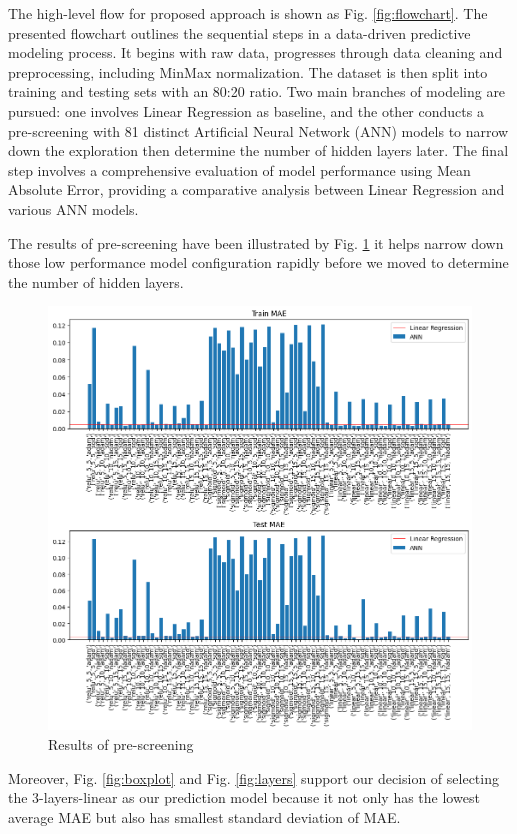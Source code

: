 \documentclass[sigplan,screen]{acmart}
\begin{document}
The high-level flow for proposed approach is shown as Fig. \ref{fig:flowchart}. The presented flowchart outlines the sequential steps in a data-driven predictive modeling process. It begins with raw data, progresses through data cleaning and preprocessing, including MinMax normalization. The dataset is then split into training and testing sets with an 80:20 ratio. Two main branches of modeling are pursued: one involves Linear Regression as baseline, and the other conducts a pre-screening with 81 distinct Artificial Neural Network (ANN) models to narrow down the exploration then determine the number of hidden layers later. The final step involves a comprehensive evaluation of model performance using Mean Absolute Error, providing a comparative analysis between Linear Regression and various ANN models.

The results of pre-screening have been illustrated by Fig. \ref{fig:prescreen_output} it helps narrow down those low performance model configuration rapidly before we moved to determine the number of hidden layers.

\begin{figure}
  \centering
  \includegraphics[width=0.8\linewidth]{prescreening_output.png}
  \caption{Results of pre-screening}
  \label{fig:prescreen_output}
\end{figure}


Moreover, Fig. \ref{fig:boxplot} and Fig. \ref{fig:layers} support our decision of selecting the 3-layers-linear as our prediction model because it not only has the lowest average MAE but also has smallest standard deviation of MAE.
\end{document}
